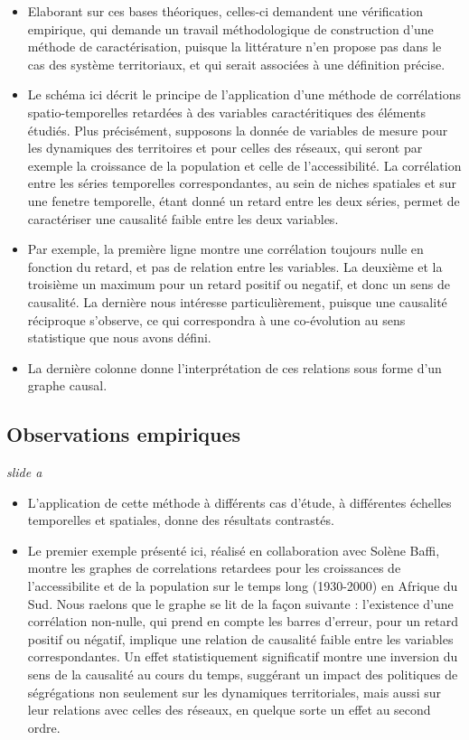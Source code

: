 \documentclass[11pt]{article}
\begin{document}
\begin{itemize}
	\item Elaborant sur ces bases théoriques, celles-ci demandent une vérification empirique, qui demande un travail méthodologique de construction d'une méthode de caractérisation, puisque la littérature n'en propose pas dans le cas des système territoriaux, et qui serait associées à une définition précise.
	\item Le schéma ici décrit le principe de l'application d'une méthode de corrélations spatio-temporelles retardées à des variables caractéritiques des éléments étudiés. Plus précisément, supposons la donnée de variables de mesure pour les dynamiques des territoires et pour celles des réseaux, qui seront par exemple la croissance de la population et celle de l'accessibilité. La corrélation entre les séries temporelles correspondantes, au sein de niches spatiales et sur une fenetre temporelle, étant donné un retard entre les deux séries, permet de caractériser une causalité faible entre les deux variables.
	\item Par exemple, la première ligne montre une corrélation toujours nulle en fonction du retard, et pas de relation entre les variables. La deuxième et la troisième un maximum pour un retard positif ou negatif, et donc un sens de causalité. La dernière nous intéresse particulièrement, puisque une causalité réciproque s'observe, ce qui correspondra à une co-évolution au sens statistique que nous avons défini.
	\item La dernière colonne donne l'interprétation de ces relations sous forme d'un graphe causal.
\end{itemize}



\subsection*{Observations empiriques}


\textit{slide a}

\begin{itemize}
	\item L'application de cette méthode à différents cas d'étude, à différentes échelles temporelles et spatiales, donne des résultats contrastés.
	\item Le premier exemple présenté ici, réalisé en collaboration avec Solène Baffi, montre les graphes de correlations retardees pour les croissances de l'accessibilite et de la population sur le temps long (1930-2000) en Afrique du Sud. Nous raelons que le graphe se lit de la façon suivante : l'existence d'une corrélation non-nulle, qui prend en compte les barres d'erreur, pour un retard positif ou négatif, implique une relation de causalité faible entre les variables correspondantes. Un effet statistiquement significatif montre une inversion du sens de la causalité au cours du temps, suggérant un impact des politiques de ségrégations non seulement sur les dynamiques territoriales, mais aussi sur leur relations avec celles des réseaux, en quelque sorte un effet au second ordre.
\end{itemize}
	
\end{document}
